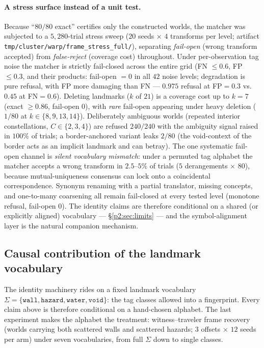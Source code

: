 \documentclass{article}
\begin{document}
\paragraph{A stress surface instead of a unit test.} Because
``$80/80$ exact'' certifies only the constructed worlds, the matcher
was subjected to a $5{,}280$-trial stress sweep ($20$ seeds
$\times$ $4$ transforms per level; artifact
\texttt{tmp/cluster/warp/frame\_stress\_full/}), separating
\emph{fail-open} (wrong transform accepted) from \emph{false-reject}
(coverage cost) throughout. Under per-observation tag noise the
matcher is strictly fail-closed across the entire grid
(FN $\le 0.6$, FP $\le 0.3$, and their products: fail-open $= 0$ in
all $42$ noise levels; degradation is pure refusal, with FP more
damaging than FN --- $0.975$ refusal at FP$=0.3$ vs.\ $0.45$ at
FN$=0.6$). Deleting landmarks ($k$ of $21$) is a coverage cost up to
$k{=}7$ (exact $\ge 0.86$, fail-open $0$), with \emph{rare} fail-open
appearing under heavy deletion ($1/80$ at
$k \in \{8, 9, 13, 14\}$). Deliberately ambiguous worlds (repeated
interior constellations, $C \in \{2,3,4\}$) are refused $240/240$
with the ambiguity signal raised in $100\%$ of trials; a
border-anchored variant leaks $2/80$ (the void-context of the border
acts as an implicit landmark and can betray). The one systematic
fail-open channel is \emph{silent vocabulary mismatch}: under a
permuted tag alphabet the matcher accepts a wrong transform in
$2.5$--$5\%$ of trials ($5$ derangements $\times$ $80$), because
mutual-uniqueness consensus can lock onto a coincidental
correspondence. Synonym renaming with a partial translator, missing
concepts, and one-to-many coarsening all remain fail-closed at every
tested level (monotone refusal, fail-open $0$). The identity claims
are therefore conditional on a shared (or explicitly aligned)
vocabulary --- \S\ref{p2:sec:limits} --- and the symbol-alignment
layer is the natural companion mechanism.

\subsection{Causal contribution of the landmark vocabulary}
\label{p3:sec:ablation}

The identity machinery rides on a fixed landmark vocabulary $\Sigma =
\{\texttt{wall}, \texttt{hazard}, \texttt{water}, \texttt{void}\}$:
the tag classes allowed into a fingerprint. Every claim above is
therefore conditional on a hand-chosen alphabet. The last experiment
makes the alphabet the treatment: witness--traveler frame recovery
(worlds carrying both scattered walls and scattered hazards; $3$
offsets $\times$ $12$ seeds per arm) under seven vocabularies, from
full $\Sigma$ down to single classes.
\end{document}
